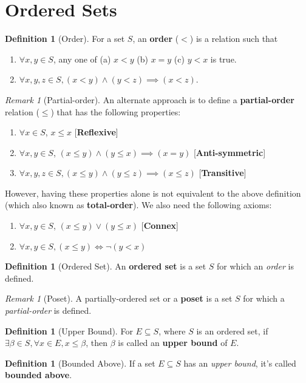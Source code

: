 \documentclass[a4paper,12pt]{report}
\newcommand{\tb}{\textbf}
\theoremstyle{plain}
\theoremstyle{definition}
\newtheorem{definition}[theorem]{\color{red}Definition} %
\theoremstyle{remark}
\newtheorem{remark}[theorem]{\color{ForestGreen}Remark} %
\begin{document}
\section{Ordered Sets}
\begin{definition}[Order]
For a set $S$, an \tb{order} ($<$) is a relation such that
\begin{enumerate}
\item$ \forall x,y\in S$, any one of (a) $x<y$ (b) $x=y$ (c) $y<x$ is true.
\item $\forall x,y,z\in S, (x<y)\wedge (y<z)\implies (x<z)$.
\end{enumerate}
\end{definition}
\begin{remark}[Partial-order]
An alternate approach is to define a \tb{partial-order} relation ($\leq$) that has the following properties:
\begin{enumerate}
\item $\forall x\in S$, $x\leq x$ [\tb{Reflexive}]
\item $\forall x,y\in S$, $(x\leq y)\wedge (y\leq x)\implies (x=y)$ [\tb{Anti-symmetric}]
\item $\forall x,y,z\in S, (x\leq y)\wedge (y\leq z)\implies (x\leq z)$ [\tb{Transitive}]
\end{enumerate}
However, having these properties alone is not equivalent to the above definition (which also known as \tb{total-order}). We also need the following axioms:
\begin{enumerate}
\item $\forall x,y\in S$, $(x\leq y)\vee (y\leq x)$ [\tb{Connex}]
\item $\forall x,y\in S, (x\leq y)\iff \neg(y < x)$
\end{enumerate}
\end{remark}
\begin{definition}[Ordered Set]
An \tb{ordered set} is a set $S$ for which an \emph{order} is defined.
\end{definition}
\begin{remark}[Poset]
A partially-ordered set or a \tb{poset} is a set $S$ for which a \emph{partial-order} is defined.
\end{remark}
\begin{definition}[Upper Bound]
For $E\subseteq S$, where $S$ is an ordered set, if $\exists\beta\in S, \forall x\in E, x\le\beta$, then $\beta$ is called an \tb{upper bound} of $E$.
\end{definition}
\begin{definition}[Bounded Above]
If a set $E\subseteq S$ has an \emph{upper bound}, it's called \tb{bounded above}.
\end{definition}
\end{document}
